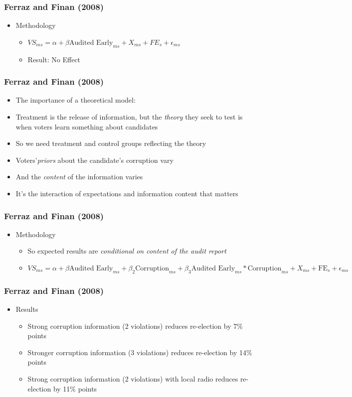 \documentclass[xcolor=x11names,compress]{beamer}\usepackage[]{graphicx}\usepackage[]{color}
\renewcommand{\(}{\begin{columns}}
\renewcommand{\)}{\end{columns}}
\newcommand{\<}[1]{\begin{column}{#1}}
\renewcommand{\>}{\end{column}}
\begin{document}
\begin{frame}
\frametitle{Ferraz and Finan (2008)}
\begin{itemize}
\item Methodology
\begin{itemize}
\item $VS_{ms} = \alpha + \beta \text{Audited Early}_{ms} + X_{ms} + FE_{s} + \epsilon_{ms}$
\pause
\item Result: No Effect
\end{itemize}
\end{itemize}
\end{frame}

\begin{frame}
\frametitle{Ferraz and Finan (2008)}
\begin{itemize}
\item The importance of a theoretical model:
\pause
\item Treatment is the release of information, but the \textit{theory} they seek to test is when voters learn something about candidates 
\pause
\item So we need treatment and control groups reflecting the theory
\pause
\item Voters'\textit{priors} about the candidate's corruption vary
\pause
\item And the \textit{content} of the information varies
\pause
\item It's the interaction of expectations and information content that matters
\end{itemize}
\end{frame}

\begin{frame}
\frametitle{Ferraz and Finan (2008)}
\begin{itemize}
\item Methodology
\begin{itemize}
\item So expected results are \textit{conditional on content of the audit report}
\pause
\item $VS_{ms} = \alpha + \beta \text{Audited Early}_{ms} + \beta_2 \text{Corruption}_{ms} + \beta_3 \text{Audited Early}_{ms}*\text{Corruption}_{ms} + X_{ms} + \text{FE}_{s} + \epsilon_{ms}$
\end{itemize}
\end{itemize}
\end{frame}

\begin{frame}
\frametitle{Ferraz and Finan (2008)}
\begin{itemize}
\item Results
\pause
\begin{itemize}
\item Strong corruption information (2 violations) reduces re-election by 7\% points
\pause
\item Stronger corruption information (3 violations) reduces re-election by 14\% points
\pause
\item Strong corruption information (2 violations) with local radio reduces re-election by 11\% points
\end{itemize}
\end{itemize}
\end{frame}
\end{document}
